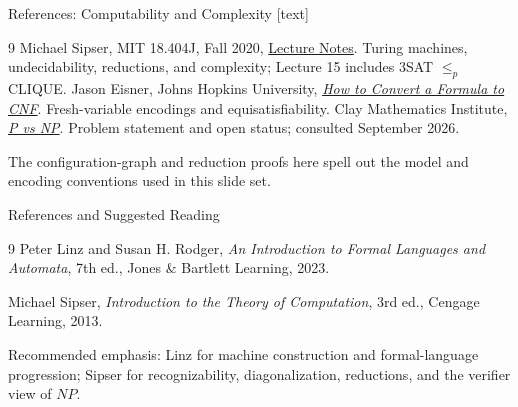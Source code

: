 \documentclass[10pt]{beamer}
\begin{document}
\begin{frame}{References: Computability and Complexity}
  \small
  [text]
  \begin{thebibliography}{9}
      Michael Sipser, MIT 18.404J, Fall 2020,
      \href{https://ocw.mit.edu/courses/18-404j-theory-of-computation-fall-2020/pages/lecture-notes/}
      {Lecture Notes}. Turing machines, undecidability, reductions,
      and complexity; Lecture 15 includes 3SAT $\le_p$ CLIQUE.
      Jason Eisner, Johns Hopkins University,
      \href{https://www.cs.jhu.edu/~jason/tutorials/convert-to-CNF}
      {\emph{How to Convert a Formula to CNF}}.
      Fresh-variable encodings and equisatisfiability.
      Clay Mathematics Institute,
      \href{https://www.claymath.org/millennium/p-vs-np/}
      {\emph{P vs NP}}. Problem statement and open status;
      consulted September 2026.
  \end{thebibliography}
  The configuration-graph and reduction proofs here spell out the model
  and encoding conventions used in this slide set.
\end{frame}

\begin{frame}{References and Suggested Reading}
  \small
  \begin{thebibliography}{9}
      Peter Linz and Susan H. Rodger,
      \newblock \emph{An Introduction to Formal Languages and Automata}, 7th ed.,
      \newblock Jones \& Bartlett Learning, 2023.

      Michael Sipser,
      \newblock \emph{Introduction to the Theory of Computation}, 3rd ed.,
      \newblock Cengage Learning, 2013.
  \end{thebibliography}
  \vspace{0.3cm}
  Recommended emphasis: Linz for machine construction and formal-language progression; Sipser for
  recognizability, diagonalization, reductions, and the verifier view of $NP$.
\end{frame}
\end{document}
